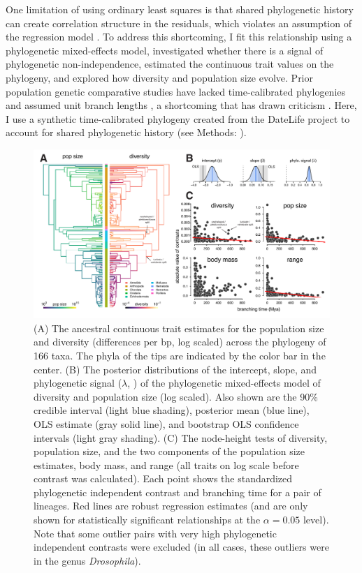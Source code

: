 \documentclass[11pt]{article}
\newcommand{\Newnameref}[1]{\textit{\nameref{#1}}}
\begin{document}
One limitation of using ordinary least squares is that shared phylogenetic
history can create correlation structure in the residuals, which violates an
assumption of the regression model
\parencite{Felsenstein1985-an,Revell2010-mf}. To address this shortcoming, I
fit this relationship using a phylogenetic mixed-effects model, investigated
whether there is a signal of phylogenetic non-independence, estimated the
continuous trait values on the phylogeny, and explored how diversity and
population size evolve. Prior population genetic comparative studies have
lacked time-calibrated phylogenies and assumed unit branch lengths
\parencite{Whitney2010-ud}, a shortcoming that has drawn criticism
\parencite{Lynch2011-qv}. Here, I use a synthetic time-calibrated phylogeny
created from the DateLife project \parencite{OMeara2020-ds} to account for
shared phylogenetic history (see Methods: \Newnameref{sec:methods-pcm}).

\begin{figure}[t!]
  \centering
  \includegraphics[width=\textwidth]{figures/diversity_pcm.pdf}

  \caption{(A) The ancestral continuous trait estimates for the population size
    and diversity (differences per bp, log scaled) across the phylogeny of 166
    taxa. The phyla of the tips are indicated by the color bar in the center.
    (B) The posterior distributions of the intercept, slope, and phylogenetic
    signal ($\lambda$, \cite{De_Villemereuil2014-kt}) of the phylogenetic
    mixed-effects model of diversity and population size (log scaled). Also
    shown are the 90\% credible interval (light blue shading), posterior mean
    (blue line), OLS estimate (gray solid line), and bootstrap OLS confidence
    intervals (light gray shading).  (C) The node-height tests of diversity,
    population size, and the two components of the population size estimates,
    body mass, and range (all traits on log scale before contrast was
    calculated). Each point shows the standardized phylogenetic independent
    contrast and branching time for a pair of lineages. Red lines are robust
    regression estimates (and are only shown for statistically significant
    relationships at the $\alpha = 0.05$ level). Note that some outlier pairs
    with very high phylogenetic independent contrasts were excluded (in all
    cases, these outliers were in the genus \emph{Drosophila}).}

  \label{fig:figure-2}
\end{figure}
\end{document}
